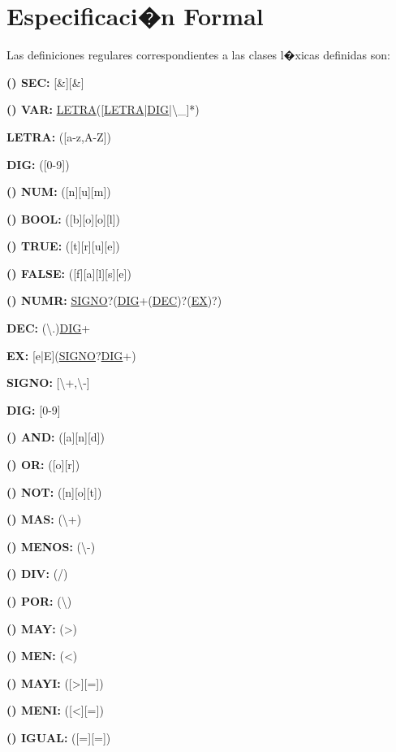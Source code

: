 \documentclass[11pt,oneside,onecolumn,openany,spanish]{book}
\begin{document}
\section{Especificaci�n Formal}
\label{cap2:sec:especificacion_formal}

Las definiciones regulares correspondientes a las clases l�xicas definidas son:

	\textbf{(\mystar )  SEC:} [\&][\&]
	
	\textbf{(\mystar ) VAR:} \underline{LETRA}([\underline{LETRA}|\underline{DIG}|\textbackslash \_]*)
	
	\tab \textbf{LETRA:} ([a-z,A-Z])
	
	\tab \textbf{DIG:} ([0-9])
	
	\textbf{(\mystar ) NUM:} ([n][u][m])
	
	\textbf{(\mystar ) BOOL:} ([b][o][o][l])
	
	\textbf{(\mystar ) TRUE:} ([t][r][u][e])
	
	\textbf{(\mystar ) FALSE:} ([f][a][l][s][e])
	
	\textbf{(\mystar ) NUMR:} \underline{SIGNO}?(\underline{DIG}+(\underline{DEC})?(\underline{EX})?) 
	
	\tab \textbf{DEC:} (\textbackslash .)\underline{DIG}+ 
	
	\tab \textbf{EX:} [e|E](\underline{SIGNO}?\underline{DIG}+)
	
	\tab \textbf{SIGNO:} [\textbackslash +,\textbackslash -] 
	
	\tab \textbf{DIG:} [0-9]
	
	\textbf{(\mystar ) AND:} ([a][n][d])
	
	\textbf{(\mystar ) OR:} ([o][r])
	
	\textbf{(\mystar ) NOT:} ([n][o][t])
	
	\textbf{(\mystar ) MAS:} (\textbackslash +)
	
	\textbf{(\mystar ) MENOS:} (\textbackslash -)
	
	\textbf{(\mystar ) DIV:} (/)
	
	\textbf{(\mystar ) POR:} (\textbackslash *)
	
	\textbf{(\mystar ) MAY:} (>)
	
	\textbf{(\mystar ) MEN:} (<)
	
	\textbf{(\mystar ) MAYI:} ([>][=])
	
	\textbf{(\mystar ) MENI:} ([<][=])
	
	\textbf{(\mystar ) IGUAL:} ([=][=])
	
\end{document}
